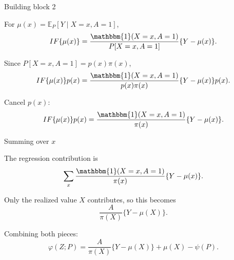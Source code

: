 \documentclass[xcolor={table}, handout]{beamer}
\begin{document}
\note{
\scriptsize \singlespacing

}
\begin{frame}{Building block 2}

\small

\begin{wideitemize}
\item For $\mu(x)=\mathbb{E}_P[Y\mid X=x,A=1]$,
\[
IF\{\mu(x)\}
  =
  \frac{\mathbbm{1}(X=x,A=1)}
       {P[X=x,A=1]}
  \{Y-\mu(x)\}.
\]\pause
\item Since $P[X=x,A=1]=p(x)\pi(x)$,
\[
IF\{\mu(x)\}p(x)
  =
  \frac{\mathbbm{1}(X=x,A=1)}
       {p(x)\pi(x)}
  \{Y-\mu(x)\}p(x).
\]\pause
\item Cancel $p(x)$:
\[
IF\{\mu(x)\}p(x)
  =
  \frac{\mathbbm{1}(X=x,A=1)}
       {\pi(x)}
  \{Y-\mu(x)\}.
\]
\end{wideitemize}

\end{frame}

\note{
\scriptsize \singlespacing

}
\begin{frame}{Summing over $x$}

\begin{wideitemize}
\item The regression contribution is
\[
\sum_x
\frac{\mathbbm{1}(X=x,A=1)}
     {\pi(x)}
\{Y-\mu(x)\}.
\]\pause
\item Only the realized value $X$ contributes, so this becomes
\[
\frac{A}{\pi(X)}
\{Y-\mu(X)\}.
\]\pause
\item Combining both pieces:
\[
\varphi(Z;P)
  =
  \frac{A}{\pi(X)}
  \{Y-\mu(X)\}
  +
  \mu(X)-\psi(P).
\]
\end{wideitemize}

\end{frame}
\end{document}
